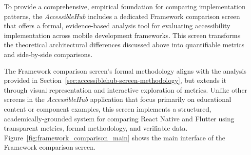 To provide a comprehensive, empirical foundation for comparing implementation patterns, the \textit{AccessibleHub} includes a dedicated Framework comparison screen that offers a formal, evidence-based analysis tool for evaluating accessibility implementation across mobile development frameworks. This screen transforms the theoretical architectural differences discussed above into quantifiable metrics and side-by-side comparisons.

The Framework comparison screen's formal methodology aligns with the analysis provided in Section~\ref{sec:accessiblehub-screen-methodology}, but extends it through visual representation and interactive exploration of metrics. Unlike other screens in the \textit{AccessibleHub} application that focus primarily on educational content or component examples, this screen implements a structured, academically-grounded system for comparing React Native and Flutter using transparent metrics, formal methodology, and verifiable data. Figure~\ref{fig:framework_comparison_main} shows the main interface of the Framework comparison screen.

